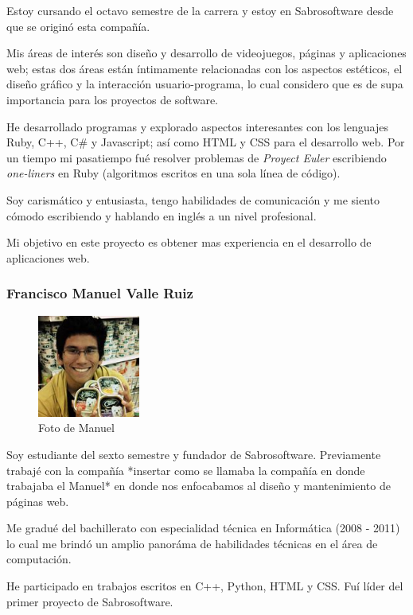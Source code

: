 \documentclass[letterpaper]{article}
\begin{document}
Estoy cursando el octavo semestre de la carrera y estoy en Sabrosoftware desde que se originó esta compañía.

Mis áreas de interés son diseño y desarrollo de videojuegos, páginas y aplicaciones web; estas dos áreas están íntimamente relacionadas con los aspectos estéticos, el diseño gráfico y la interacción usuario-programa, lo cual considero que es de supa importancia para los proyectos de software.

He desarrollado programas y explorado aspectos interesantes con los lenguajes Ruby, C++, C\# y Javascript; así como HTML y CSS para el desarrollo web. Por un tiempo mi pasatiempo fué resolver problemas de \emph{Proyect Euler} escribiendo \emph{one-liners} en Ruby (algoritmos escritos en una sola línea de código).

Soy carismático y entusiasta, tengo habilidades de comunicación y me siento cómodo escribiendo y hablando en inglés a un nivel profesional.

Mi objetivo en este proyecto es obtener mas experiencia en el desarrollo de aplicaciones web.

\subsubsection*{Francisco Manuel Valle Ruiz}

\begin{figure}[h!]
  \centering
    \includegraphics[width=0.3\textwidth]{Manuel}
    \caption{Foto de Manuel}
\end{figure}

Soy estudiante del sexto semestre y fundador de Sabrosoftware. Previamente trabajé con la compañía *insertar como se llamaba la compañía en donde trabajaba el Manuel* en donde nos enfocabamos al diseño y mantenimiento de páginas web.

Me gradué del bachillerato con especialidad técnica en Informática (2008 - 2011) lo cual me brindó un amplio panoráma de habilidades técnicas en el área de computación.

He participado en trabajos escritos en C++, Python, HTML y CSS. Fuí líder del primer proyecto de Sabrosoftware.
\end{document}
